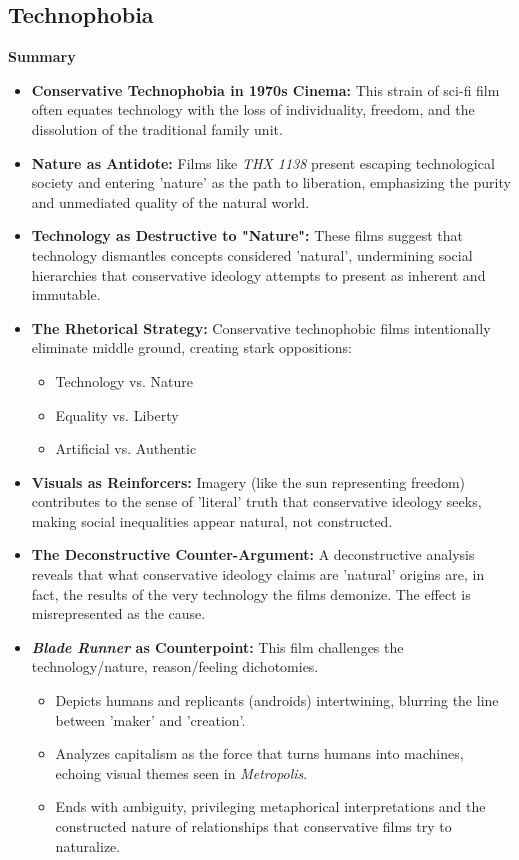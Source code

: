 \documentclass[11pt,fleqn]{book} %
\begin{document}
\subsection{Technophobia}
\textbf{Summary}

\begin{itemize}
\item \textbf{Conservative Technophobia in 1970s Cinema:}  This strain of sci-fi film often equates technology with the loss of individuality, freedom, and the dissolution of the traditional family unit.

\item \textbf{Nature as Antidote:} Films like \textit{THX 1138} present escaping technological society and entering 'nature' as the path to liberation, emphasizing the purity and unmediated quality of the natural world.

\item \textbf{Technology as Destructive to "Nature":}  These films suggest that technology dismantles concepts considered 'natural', undermining social hierarchies that conservative ideology attempts to present as inherent and immutable.

\item \textbf{The Rhetorical Strategy:} Conservative technophobic films intentionally eliminate middle ground, creating stark oppositions:
    \begin{itemize}
        \item Technology vs. Nature
        \item Equality vs. Liberty
        \item Artificial vs. Authentic
    \end{itemize}

\item \textbf{Visuals as Reinforcers:}  Imagery (like the sun representing freedom) contributes to the sense of 'literal' truth that conservative ideology seeks, making social inequalities appear natural, not constructed.

\item \textbf{The Deconstructive Counter-Argument:}  A deconstructive analysis reveals that what conservative ideology claims are 'natural' origins are, in fact, the results of the very technology the films demonize.  The effect is misrepresented as the cause.

\item \textbf{\textit{Blade Runner} as Counterpoint:}  This film challenges the  technology/nature, reason/feeling dichotomies. 
    \begin{itemize}
        \item Depicts humans and replicants (androids) intertwining, blurring the line between 'maker' and 'creation'. 
        \item Analyzes capitalism as the force that turns humans into machines, echoing visual themes seen in \textit{Metropolis}.
        \item Ends with  ambiguity, privileging metaphorical interpretations and the constructed nature of relationships that conservative films try to naturalize.
    \end{itemize}
\end{itemize}
\end{document}
